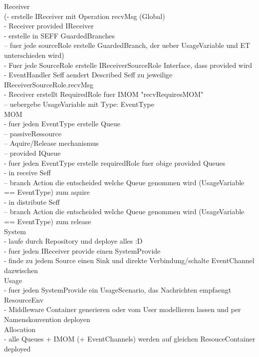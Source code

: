 Receiver\\
(- erstelle IReceiver mit Operation recvMsg (Global)\\
- Receiver provided IReceiver\\
- erstelle in SEFF GuardedBranches\\
-- fuer jede sourceRole erstelle GuardedBranch, der ueber UsageVariable und ET unterschieden wird)\\

- Fuer jede SourceRole erstelle IReceiverSourceRole Interface, dass provided wird\\
- EventHandler Seff aendert Described Seff zu jeweilige IReceiverSourceRole.recvMsg\\
- Receiver erstellt RequiredRole fuer IMOM "recvRequiresMOM"\\
-- uebergebe UsageVariable mit Type: EventType\\

MOM\\
- fuer jeden EventType erstelle Queue\\
-- passiveRessource \\
-- Aquire/Release mechanismus\\
-- provided IQueue\\

- fuer jeden EventType erstelle requiredRole fuer obige provided Queues\\
- in receive Seff\\
-- branch Action die entscheided welche Queue genommen wird (UsageVariable == EventType) zum aquire\\

- in distribute Seff\\
-- branch Action die entscheided welche Queue genommen wird (UsageVariable == EventType) zum release\\

System\\
- laufe durch Repository und deploye alles :D\\
- fuer jeden IReceiver provide einen SystemProvide\\
- finde zu jedem Source einen Sink und direkte Verbindung/schalte EventChannel dazwischen\\

Usage\\
- fuer jeden SystemProvide ein UsageScenario, das Nachrichten empfaengt\\

ResourceEnv\\
- Middleware Container generieren oder vom User modellieren lassen und per Namenskonvention deployen\\

Allocation\\
- alle Queues + IMOM (+ EventChannels) werden auf gleichen ResouceContainer deployed\\